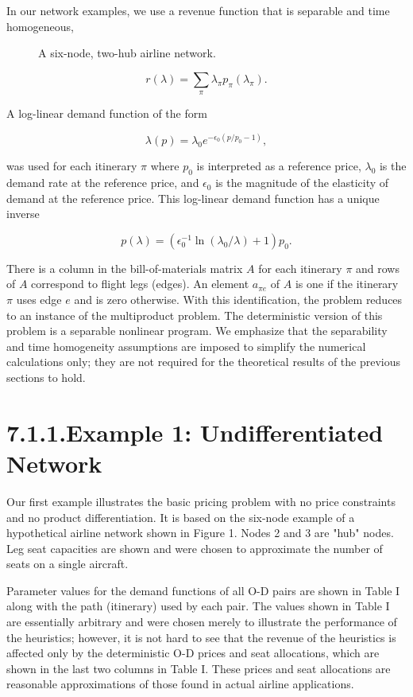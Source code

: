 In our network examples, we use a revenue function that is separable and time homogeneous,

\begin{figure}[h]
\centering
\caption{A six-node, two-hub airline network.}
\label{fig:network}
\end{figure}

\[
r(\lambda) = \sum_{\pi} \lambda_{\pi} p_{\pi} (\lambda_{\pi}) .
\]

A log-linear demand function of the form

\[
\lambda(p) = \lambda_{0} e^{-\epsilon_{0} (p / p_{0} - 1)} ,
\]

was used for each itinerary \(\pi\) where \(p_{0}\) is interpreted as a reference price, \(\lambda_{0}\) is the demand rate at the reference price, and \(\epsilon_{0}\) is the magnitude of the elasticity of demand at the reference price. This log-linear demand function has a unique inverse

\[
p(\lambda) = (\epsilon_{0}^{-1} \ln (\lambda_{0} / \lambda) + 1) p_{0} .
\]

There is a column in the bill-of-materials matrix \(A\) for each itinerary \(\pi\) and rows of \(A\) correspond to flight legs (edges). An element \(a_{\pi e}\) of \(A\) is one if the itinerary \(\pi\) uses edge \(e\) and is zero otherwise. With this identification, the problem reduces to an instance of the multiproduct problem. The deterministic version of this problem is a separable nonlinear program. We emphasize that the separability and time homogeneity assumptions are imposed to simplify the numerical calculations only; they are not required for the theoretical results of the previous sections to hold.

\section{7.1.1.Example 1: Undifferentiated Network}\label{undifferentiated-network}

Our first example illustrates the basic pricing problem with no price constraints and no product differentiation. It is based on the six-node example of a hypothetical airline network shown in Figure 1. Nodes 2 and 3 are "hub" nodes. Leg seat capacities are shown and were chosen to approximate the number of seats on a single aircraft.

Parameter values for the demand functions of all O-D pairs are shown in Table I along with the path (itinerary) used by each pair. The values shown in Table I are essentially arbitrary and were chosen merely to illustrate the performance of the heuristics; however, it is not hard to see that the revenue of the heuristics is affected only by the deterministic O-D prices and seat allocations, which are shown in the last two columns in Table I. These prices and seat allocations are reasonable approximations of those found in actual airline applications.

